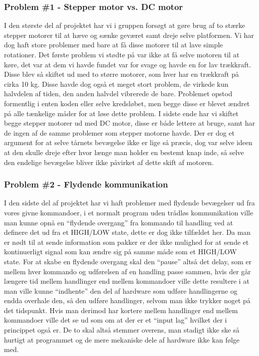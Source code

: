 \subsubsection{Problem \#1 - Stepper motor vs. DC motor}
I den største del af projektet har vi i gruppen forsøgt at gøre brug af to stærke stepper motorer til at hæve og sænke geværet samt dreje selve platformen. Vi har dog haft store problemer med bare at få disse motorer til at lave simple rotationer. Det første problem vi stødte på var ikke at få selve motoren til at køre, det var at dem vi havde fundet var for svage og havde en for lav trækkraft. Disse blev så skiftet ud med to større motorer, som hver har en trækkraft på cirka 10 kg. Disse havde dog også et meget stort problem, de virkede kun halvdelen af tiden, den anden halvdel vibrerede de bare. Problemet opstod formentlig i enten koden eller selve kredsløbet, men begge disse er blevet ændret på alle tænkelige måder for at løse dette problem. I sidste ende har vi skiftet begge stepper motorer ud med DC motor, disse er både lettere at bruge, samt har de ingen af de samme problemer som stepper motorne havde. Der er dog et argument for at selve tårnets bevægelse ikke er lige så præcis, dog var selve ideen at den skulle dreje efter hvor længe man holder en bestemt knap inde, så selve den endelige bevægelse bliver ikke påvirket af dette skift af motoren.

\subsubsection{Problem \#2 - Flydende kommunikation}
I den sidste del af projektet har vi haft problemer med flydende bevægelser ud fra vores givne kommandoer, i et normalt program uden trådløs kommunikation ville man kunne opnå en “flydende overgang” fra kommando til handling ved at definere det ud fra et HIGH/LOW state, dette er dog ikke tilfældet her. Da man er nødt til at sende information som pakker er der ikke mulighed for at sende et kontinuerligt signal som kan ændre sig på samme måde som et HIGH/LOW state. For at skabe en flydende overgang skal den “pause” altså det delay, som er mellem hver kommando og udførelsen af en handling passe sammen, hvis der går længere tid mellem handlinger end mellem kommandoer ville dette resultere i at man ville kunne “indhente” den del af hardware som udføre handlingerne og endda overhale den, så den udføre handlinger, selvom man ikke trykker noget på det tidspunkt. Hvis man derimod har kortere mellem handlinger end mellem kommandoer ville det se ud som om at der er et “input lag” hvilket der i princippet også er. De to skal altså stemmer overens, man stadigt ikke ske så hurtigt at programmet og de mere mekaniske dele af hardware ikke kan følge med.\\

